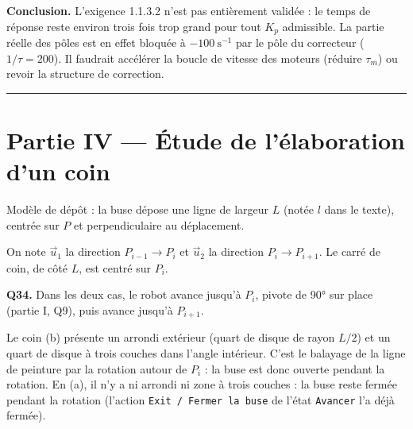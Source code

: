 \documentclass[11pt,a4paper]{article}
\begin{document}
\textbf{Conclusion.} L'exigence 1.1.3.2 n'est pas entièrement validée : le temps de réponse reste environ trois fois trop grand pour tout \(K_p\) admissible. La partie réelle des pôles est en effet bloquée à \(-100\ \text{s}^{-1}\) par le pôle du correcteur (\(1/\tau = 200\)). Il faudrait accélérer la boucle de vitesse des moteurs (réduire \(\tau_m\)) ou revoir la structure de correction.

\begin{center}\rule{0.5\linewidth}{0.5pt}\end{center}

\hypertarget{partie-iv-uxe9tude-de-luxe9laboration-dun-coin}{%
\section{Partie IV --- Étude de l'élaboration d'un coin}\label{partie-iv-uxe9tude-de-luxe9laboration-dun-coin}}

Modèle de dépôt : la buse dépose une ligne de largeur \(L\) (notée \(l\) dans le texte), centrée sur \(P\) et perpendiculaire au déplacement.

On note \(\vec u_1\) la direction \(P_{i-1}\to P_i\) et \(\vec u_2\) la direction \(P_i\to P_{i+1}\). Le carré de coin, de côté \(L\), est centré sur \(P_i\).

\textbf{Q34.} Dans les deux cas, le robot avance jusqu'à \(P_i\), pivote de 90° sur place (partie I, Q9), puis avance jusqu'à \(P_{i+1}\).

Le coin (b) présente un arrondi extérieur (quart de disque de rayon \(L/2\)) et un quart de disque à trois couches dans l'angle intérieur. C'est le balayage de la ligne de peinture par la rotation autour de \(P_i\) : la buse est donc ouverte pendant la rotation. En (a), il n'y a ni arrondi ni zone à trois couches : la buse reste fermée pendant la rotation (l'action \texttt{Exit\ /\allowbreak{}\ Fermer\ la\ buse} de l'état \texttt{Avancer} l'a déjà fermée).
\end{document}
